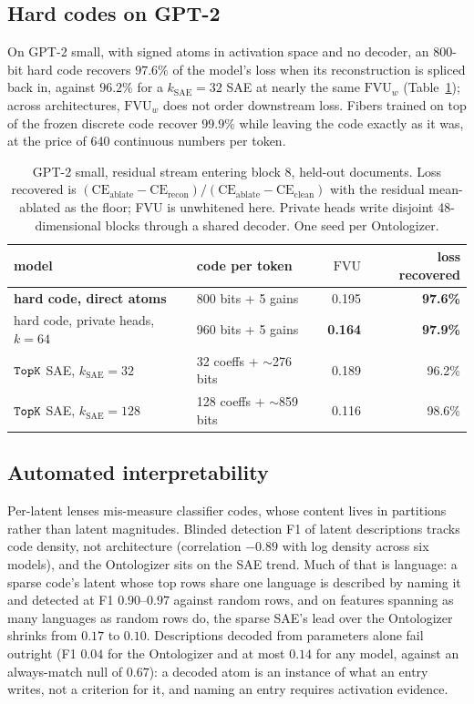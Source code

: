 \subsection{Hard codes on GPT-2}
\label{sec:prelim-gpt2}
On GPT-2 small, with signed atoms in activation space and no decoder, an
800-bit hard code recovers $97.6\%$ of the model's loss when its
reconstruction is spliced back in, against $96.2\%$ for a $k_{\mathrm{SAE}}{=}32$ SAE at
nearly the same $\mathrm{FVU}_w$ (Table~\ref{tab:prelim-gpt2}); across
architectures, $\mathrm{FVU}_w$ does not order downstream loss. Fibers
trained on top of the frozen discrete code recover $99.9\%$ while leaving
the code exactly as it was, at the price of 640 continuous numbers per
token.

\begin{table}[tp]\centering\small
\begin{tabular}{@{}llrr@{}}
\toprule
model & code per token & $\mathrm{FVU}$ & loss recovered \\
\midrule
\textbf{hard code, direct atoms} & 800 bits + 5 gains & 0.195 & \textbf{97.6\%} \\
hard code, private heads, $k{=}64$ & 960 bits + 5 gains & \textbf{0.164} & \textbf{97.9\%} \\
$\mathop{\mathtt{TopK}}\limits$ SAE, $k_{\mathrm{SAE}}{=}32$ & 32 coeffs + $\sim$276 bits & 0.189 & 96.2\% \\
$\mathop{\mathtt{TopK}}\limits$ SAE, $k_{\mathrm{SAE}}{=}128$ & 128 coeffs + $\sim$859 bits & 0.116 & 98.6\% \\
\bottomrule
\end{tabular}
\caption{GPT-2 small, residual stream entering block 8, held-out
documents. Loss recovered is
$(\mathrm{CE}_{\mathrm{ablate}} - \mathrm{CE}_{\mathrm{recon}}) /
(\mathrm{CE}_{\mathrm{ablate}} - \mathrm{CE}_{\mathrm{clean}})$ with the
residual mean-ablated as the floor; FVU is unwhitened here. Private
heads write disjoint 48-dimensional blocks through a shared decoder. One
seed per Ontologizer.}
\label{tab:prelim-gpt2}
\end{table}

\subsection{Automated interpretability}
\label{sec:prelim-autointerp}
Per-latent lenses mis-measure classifier codes, whose content lives in
partitions rather than latent magnitudes. Blinded detection F1 of
latent descriptions tracks code density, not architecture (correlation
$-0.89$ with log density across six models), and the Ontologizer sits on
the SAE trend. Much of that is language: a sparse code's latent whose top
rows share one language is described by naming it and detected at F1
$0.90$--$0.97$ against random rows, and on features spanning as many
languages as random rows do, the sparse SAE's lead over the Ontologizer
shrinks from $0.17$ to $0.10$. Descriptions decoded from parameters alone fail outright
(F1 $0.04$ for the Ontologizer and at most $0.14$ for any model, against
an always-match null of $0.67$): a decoded
atom is an instance of what an entry writes, not a criterion for it, and
naming an entry requires activation evidence.

